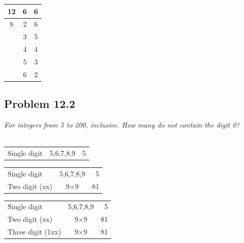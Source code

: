\documentclass[handout]{beamer}
\begin{document}
\begin{frame}[c,shrink]{\subsecname}
\begin{overprint}
\begin{table}[tp]
\begin{tabular}{ccc}
                     12 	& 6	   & 6 	\\\hline
                     8 	& 2	   & 6 	\\
                      	& 3	   & 5 	\\
                      	& 4	   & 4 	\\
                      	& 5	   & 3 	\\
                      	& 6	   & 2 	\\\hline%
                \end{tabular}
            \end{table}
            \end{overprint}
        \end{frame}
        
        
        
    \subsection{Problem 12.2}
    
        \begin{frame}[c]{\subsecname}
            \textit{For integers from 5 to 200, inclusive. How many do not contain the digit 0?}\\
            $\;$\\
            \begin{overprint}
                \begin{tabular}{lcr}
                     Single digit		& 5,6,7,8,9 	& 5 	
                \end{tabular}            
                \begin{tabular}{lcr}
                     Single digit		& 5,6,7,8,9 	& 5 	\\
                     Two digit  (xx) 		& 9$\times$9 	& 81 	
                \end{tabular}   
                \begin{tabular}{lcr}
                     Single digit		& 5,6,7,8,9 	& 5 	\\
                     Two digit (xx)  		& 9$\times$9 	& 81 	\\
                     Three digit (1xx)  	& 9$\times$9 	& 81 	
                \end{tabular}   
            \end{overprint}
            $\;$\\
        \end{frame}
        
\end{document}

